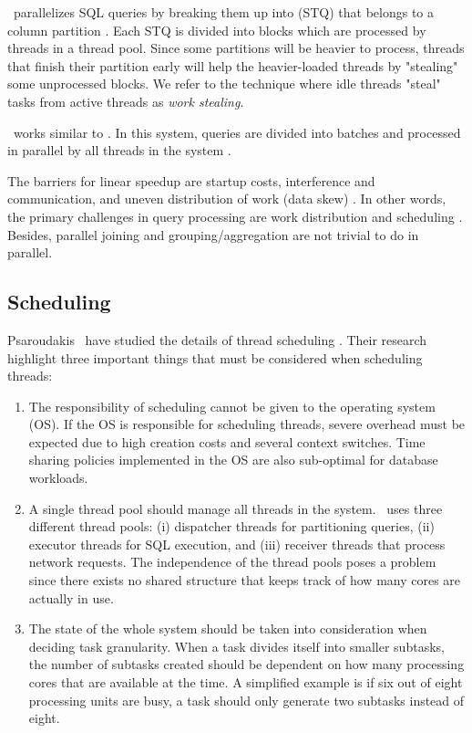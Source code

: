 \blink~parallelizes SQL queries by breaking them up into  (STQ) that belongs to a column partition \cite{Barber2012-xt}. Each STQ is divided into blocks which are processed by threads in a thread pool. Since some partitions will be heavier to process, threads that finish their partition early will help the heavier-loaded threads by "stealing" some unprocessed blocks. We refer to the technique where idle threads "steal" tasks from active threads as \textit{work stealing}. 

\mssql~works similar to \blink. In this system, queries are divided into batches and processed in parallel by all threads in the system \cite{Larson2013-mc}.

The barriers for linear speedup are startup costs, interference and communication, and uneven distribution of work (data skew) \cite{DeWitt1992-ki}. In other words, the primary challenges in query processing are work distribution and scheduling \cite{Neumann2011-uq}. Besides, parallel joining and grouping/aggregation are not trivial to do in parallel.

\subsection{Scheduling}
\label{sub:Scheduling}
Psaroudakis \ea~have studied the details of thread scheduling \cite{Psaroudakis2013-fn}. Their research highlight three important things that must be considered when scheduling threads:
\begin{enumerate}
  \item The responsibility of scheduling cannot be given to the operating system (OS). If the OS is responsible for scheduling threads, severe overhead must be expected due to high creation costs and several context switches. Time sharing policies implemented in the OS are also sub-optimal for database workloads.
  \item A single thread pool should manage all threads in the system. \saph~uses three different thread pools: (i) dispatcher threads for partitioning queries, (ii) executor threads for SQL execution, and (iii) receiver threads that process network requests. The independence of the thread pools poses a problem since there exists no shared structure that keeps track of how many cores are actually in use.
  \item The state of the whole system should be taken into consideration when deciding task granularity. When a task divides itself into smaller subtasks, the number of subtasks created should be dependent on how many processing cores that are available at the time. A simplified example is if six out of eight processing units are busy, a task should only generate two subtasks instead of eight.
\end{enumerate}

